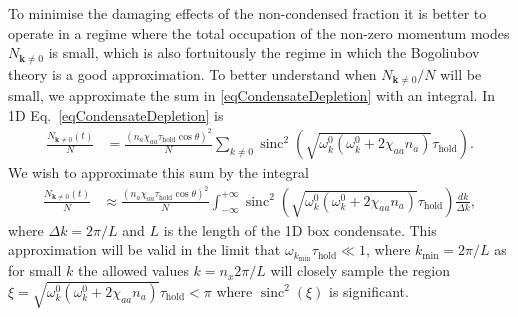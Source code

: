 \documentclass{iopart}
\DeclareMathOperator{\sinc}{sinc}
\begin{document}

To minimise the damaging effects of the non-condensed fraction it is better to operate in a regime where the total occupation of the non-zero momentum modes $N_{\mathbf{k}\neq 0}$ is small, which is also fortuitously the regime in which the Bogoliubov theory is a good approximation.  To better understand when $N_{\mathbf{k}\neq 0}/N$ will be small, we approximate the sum in \eqref{eqCondensateDepletion} with an integral.  In 1D Eq.~\eqref{eqCondensateDepletion} is
\begin{align}
  \frac{N_{\mathbf{k}\neq 0}(t)}{N} &= \frac{(n_a \chi_{aa} \tau_\text{hold} \cos\theta)^2}{N} \sum_{k \neq 0} \sinc^2\left(\sqrt{\omega^0_{k}(\omega^0_{k}+2 \chi_{aa}n_a)}\tau_\text{hold}\right).
\end{align}
We wish to approximate this sum by the integral
\begin{align}
  \frac{N_{\mathbf{k}\neq 0}(t)}{N} &\approx \frac{(n_a \chi_{aa} \tau_\text{hold} \cos\theta)^2}{N} \int_{-\infty}^{+\infty} \sinc^2 \left(\sqrt{\omega^0_{k}(\omega^0_{k}+2 \chi_{aa}n_a)}\tau_\text{hold}\right) \frac{d k}{\Delta k}, \label{eqCondensateDepletionFirstIntegralApproximation}
\end{align}
where $\Delta k = 2\pi/L$ and $L$ is the length of the 1D box condensate.  This approximation will be valid in the limit that $\omega_{k_\text{min}} \tau_\text{hold} \ll 1$, where $k_\text{min} = 2\pi/L$ as for small $k$ the allowed values $k = n_x 2\pi /L$ will closely sample the region $\xi = \sqrt{\omega_k^0(\omega_k^0 + 2 \chi_{aa} n_a)} \tau_\text{hold} < \pi$ where $\sinc^2(\xi)$ is significant.
\end{document}

